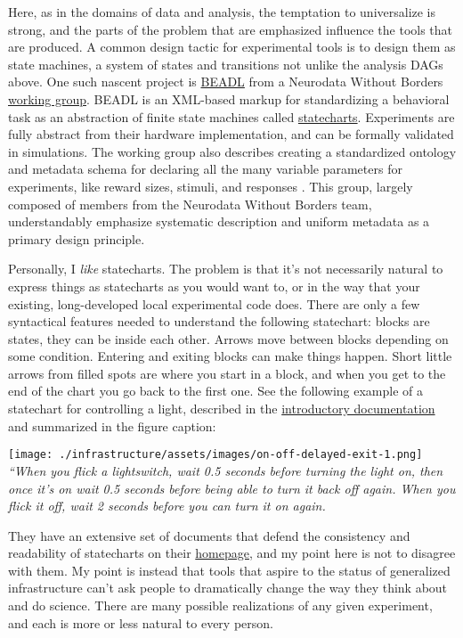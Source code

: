 Here, as in the domains of data and analysis, the temptation to
universalize is strong, and the parts of the problem that are emphasized
influence the tools that are produced. A common design tactic for
experimental tools is to design them as state machines, a system of
states and transitions not unlike the analysis DAGs above. One such
nascent project is
\href{https://archive.org/details/beadl-xml-documentation-v-0.1/mode/2up}{BEADL}
\citep{wulfBEADLXMLDocumentation2020}  from a Neurodata Without
Borders
\href{https://archive.org/details/nwb-behavioral-task-wg}{working
group}. BEADL is an XML-based markup for standardizing a behavioral task
as an abstraction of finite state machines called
\href{https://statecharts.github.io/}{statecharts}. Experiments are
fully abstract from their hardware implementation, and can be formally
validated in simulations. The working group also describes creating a
standardized ontology and metadata schema for declaring all the many
variable parameters for experiments, like reward sizes, stimuli, and
responses \citep{nwbbehavioraltaskwgNWBBehavioralTask2020} . This
group, largely composed of members from the Neurodata Without Borders
team, understandably emphasize systematic description and uniform
metadata as a primary design principle.

Personally, I \emph{like} statecharts. The problem is that it's not
necessarily natural to express things as statecharts as you would want
to, or in the way that your existing, long-developed local experimental
code does. There are only a few syntactical features needed to
understand the following statechart: blocks are states, they can be
inside each other. Arrows move between blocks depending on some
condition. Entering and exiting blocks can make things happen. Short
little arrows from filled spots are where you start in a block, and when
you get to the end of the chart you go back to the first one. See the
following example of a statechart for controlling a light, described in
the \href{https://statecharts.dev/on-off-statechart.html}{introductory
documentation} and summarized in the figure caption:

\texttt{[image: ./infrastructure/assets/images/on-off-delayed-exit-1.png]}
\emph{``When you flick a lightswitch, wait 0.5 seconds before turning
the light on, then once it's on wait 0.5 seconds before being able to
turn it back off again. When you flick it off, wait 2 seconds before you
can turn it on again.}

They have an extensive set of documents that defend the consistency and
readability of statecharts on their
\href{https://statecharts.dev/}{homepage}, and my point here is not to
disagree with them. My point is instead that tools that aspire to the
status of generalized infrastructure can't ask people to dramatically
change the way they think about and do science. There are many possible
realizations of any given experiment, and each is more or less natural
to every person.

